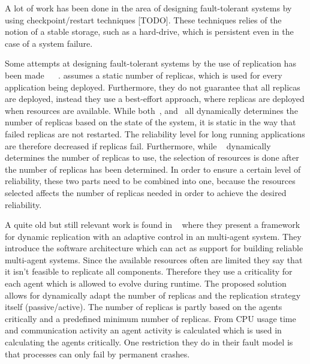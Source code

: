\documentclass{cslthse-msc}
\begin{document}
A lot of work has been done in the area of designing fault-tolerant systems by using checkpoint/restart techniques [TODO]. %
These techniques relies of the notion of a stable storage, such as a hard-drive, which is persistent even in the case of a system failure.

Some attempts at designing fault-tolerant systems by the use of replication has been made ~\cite{designFaultTolerantSched} \cite{evalReplicationSched} \cite{taskSchedulingReplication} \cite{effTaskReplMobGrid} ~\cite{relGridServicePredConstraint}. \cite{evalReplicationSched} assumes a static number of replicas, which is used for every application being deployed. Furthermore, they do not guarantee that all replicas are deployed, instead they use a best-effort approach, where replicas are deployed when resources are available. While both~\cite{effTaskReplMobGrid}, \cite{taskSchedulingReplication} and~\cite{designFaultTolerantSched} all dynamically determines the number of replicas based on the state of the system, it is static in the way that failed replicas are not restarted. The reliability level for long running applications are therefore decreased if replicas fail. Furthermore, while ~\cite{designFaultTolerantSched} dynamically determines the number of replicas to use, the selection of resources is done after the number of replicas has been determined. In order to ensure a certain level of reliability, these two parts need to be combined into one, because the resources selected affects the number of replicas needed in order to achieve the desired reliability.

A quite old but still relevant work is found in ~\cite{dynAdaptRepl} where they present a framework for dynamic replication with an adaptive control in an multi-agent system. They introduce the software architecture which can act as support for building reliable multi-agent systems. Since the available resources often are limited they say that it isn't feasible to replicate all components. Therefore they use a criticality for each agent which is allowed to evolve during runtime. The proposed solution allows for dynamically adapt the number of replicas and the replication strategy itself (passive/active). The number of replicas is partly based on the agents critically and a predefined minimum number of replicas. From CPU usage time and communication activity an agent activity is calculated which is used in calculating the agents critically. One restriction they do in their fault model is that processes can only fail by permanent crashes. %
\end{document}
